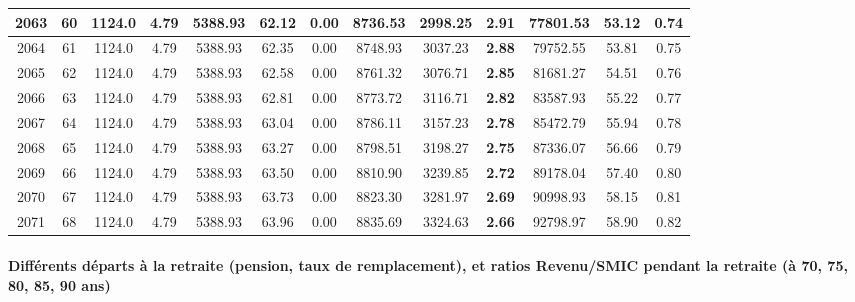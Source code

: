 {\begin{center}
\begin{tabular}[htb]{|c|c||c|c|c|c|c|c||c|c||c|c|c||}
\hline 
 2063 &  60 &  1124.0 &  4.79 &  5388.93 &  62.12 &  0.00 &  8736.53 &  2998.25 &  {\bf 2.91} &  77801.53 &  53.12 &  0.74 \\ 
\hline 
 2064 &  61 &  1124.0 &  4.79 &  5388.93 &  62.35 &  0.00 &  8748.93 &  3037.23 &  {\bf 2.88} &  79752.55 &  53.81 &  0.75 \\ 
\hline 
 2065 &  62 &  1124.0 &  4.79 &  5388.93 &  62.58 &  0.00 &  8761.32 &  3076.71 &  {\bf 2.85} &  81681.27 &  54.51 &  0.76 \\ 
\hline 
 2066 &  63 &  1124.0 &  4.79 &  5388.93 &  62.81 &  0.00 &  8773.72 &  3116.71 &  {\bf 2.82} &  83587.93 &  55.22 &  0.77 \\ 
\hline 
 2067 &  64 &  1124.0 &  4.79 &  5388.93 &  63.04 &  0.00 &  8786.11 &  3157.23 &  {\bf 2.78} &  85472.79 &  55.94 &  0.78 \\ 
\hline 
 2068 &  65 &  1124.0 &  4.79 &  5388.93 &  63.27 &  0.00 &  8798.51 &  3198.27 &  {\bf 2.75} &  87336.07 &  56.66 &  0.79 \\ 
\hline 
 2069 &  66 &  1124.0 &  4.79 &  5388.93 &  63.50 &  0.00 &  8810.90 &  3239.85 &  {\bf 2.72} &  89178.04 &  57.40 &  0.80 \\ 
\hline 
 2070 &  67 &  1124.0 &  4.79 &  5388.93 &  63.73 &  0.00 &  8823.30 &  3281.97 &  {\bf 2.69} &  90998.93 &  58.15 &  0.81 \\ 
\hline 
 2071 &  68 &  1124.0 &  4.79 &  5388.93 &  63.96 &  0.00 &  8835.69 &  3324.63 &  {\bf 2.66} &  92798.97 &  58.90 &  0.82 \\ 
\hline 
\hline 
\end{tabular} 
\end{center} } 
\newpage 
 
\paragraph{Différents départs à la retraite (pension, taux de remplacement), et ratios Revenu/SMIC pendant la retraite (à 70, 75, 80, 85, 90 ans)} 

